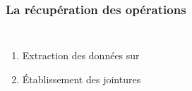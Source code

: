 \begin{frame} 
    \frametitle{La récupération des opérations}
    \begin{columns}
        \begin{enumerate}
            \item<2-> Extraction des données sur \excel
            \item<3-> Établissement des jointures
        \end{enumerate}

    \end{columns}
\end{frame}
